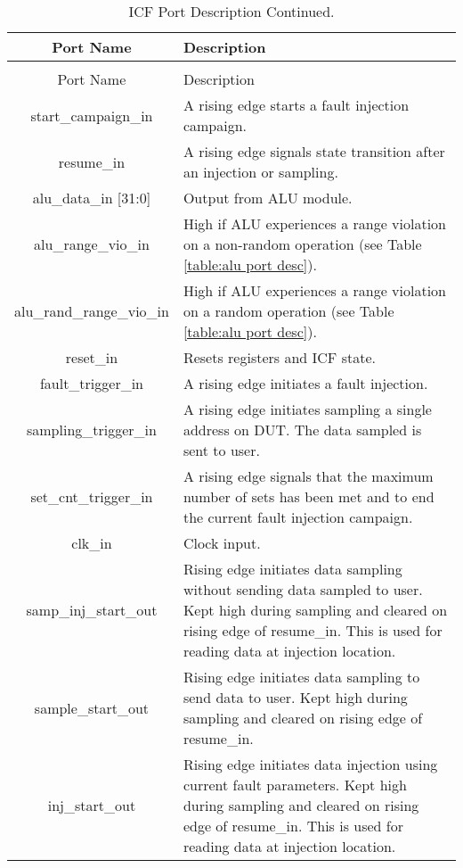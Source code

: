 \documentclass[]{report}
\begin{document}
\begin{center}
	\begin{longtable}{|c|p{11cm}|}
		\caption{ICF Port Descriptions}
		\label{table:icf port desc}\\
		\hline 
		Port Name & Description \\ 
		\hline 
		\endfirsthead
		\caption{ICF Port Description Continued.}\\
		\hline
		Port Name & Description\\
		\endhead
		\hline
		start\_campaign\_in & A rising edge starts a fault injection campaign.\\
		\hline     
		resume\_in & A rising edge signals state transition after an injection or sampling.\\              
		\hline
		alu\_data\_in [31:0] & Output from ALU module.\\       
		\hline
		alu\_range\_vio\_in & High if ALU experiences a range violation on a non-random operation (see Table \ref{table:alu port desc}).\\ 
		\hline
		alu\_rand\_range\_vio\_in & High if ALU experiences a range violation on a random operation (see Table \ref{table:alu port desc}).\\ 
		\hline
		reset\_in & Resets registers and ICF state.\\            
		\hline
		fault\_trigger\_in & A rising edge initiates a fault injection.\\      
		\hline
		sampling\_trigger\_in & A rising edge initiates sampling a single address on DUT. The data sampled is sent to user.\\
		\hline
		set\_cnt\_trigger\_in & A rising edge signals that the maximum number of sets has been met and to end the current fault injection campaign.\\   
		\hline
		clk\_in & Clock input.\\                 
		\hline
		samp\_inj\_start\_out & Rising edge initiates data sampling without sending data sampled to user. Kept high during sampling and cleared on rising edge of resume\_in. This is used for reading data at injection location.\\    
		\hline
		sample\_start\_out & Rising edge initiates data sampling to send data to user. Kept high during sampling and cleared on rising edge of resume\_in.\\   
		\hline
		inj\_start\_out & Rising edge initiates data injection using current fault parameters. Kept high during sampling and cleared on rising edge of resume\_in. This is used for reading data at injection location.\\           

\end{longtable}
\end{center}
\end{document}
